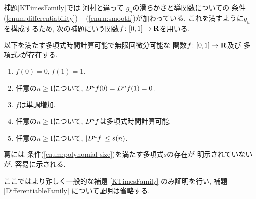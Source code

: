  補題\ref{KTimesFamily}では
 河村\cite[補題4.1]{kawamura2010lipschitz}と違って
 $g _u$の滑らかさと導関数についての
 条件(\ref{enum:differentiability}) -- (\ref{enum:smooth})が加わっている.
 これを満すように$g_u$を構成するため, 
 次の補題にいう関数$f \colon [0,1] \to \mathbf R$を用いる. 

 \begin{lemma}
  \label{SmoothFunction}
  以下を満たす多項式時間計算可能で無限回微分可能な
  関数$f \colon [0,1] \to \mathbf R$及び
  多項式$s$が存在する.
  \begin{enumerate}
   \item $f(0) = 0$, $f(1) = 1$. 
   \item 任意の$n \ge 1$について, $D ^n f (0) = D ^n f (1) = 0$. 
   \item $f$は単調増加. 
   \item 任意の$n \ge 1$について, $D ^n f$は多項式時間計算可能.
   \item \label{enum:polynomial-size}
     任意の$n \ge 1$について, $|D^n f| \le s(n)$. 
  \end{enumerate}
 \end{lemma}

葛\cite[補題3.6]{ko1991complexity}には
条件(\ref{enum:polynomial-size})を満たす多項式$s$の存在が
明示されていないが, 
容易に示される.

 ここではより難しく一般的な補題 \ref{KTimesFamily} のみ証明を行い,
 補題 \ref{DifferentiableFamily} について証明は省略する.



